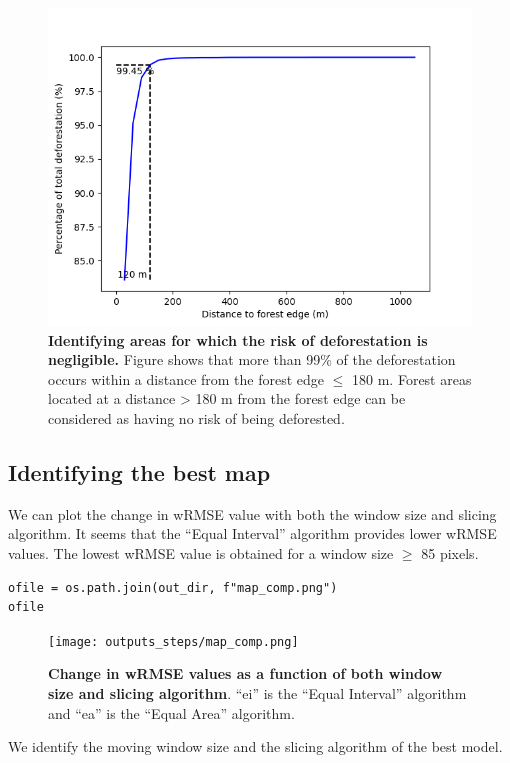 \documentclass[paper=a4, 12pt, DIV=12]{scrartcl}
\begin{document}
\begin{figure}[H]
\centering
\includegraphics[width=0.8\linewidth]{outputs_steps/perc_dist.png}
\caption{\label{fig:orgebfc8c3}\textbf{Identifying areas for which the risk of deforestation is negligible.} Figure shows that more than 99\% of the deforestation occurs within a distance from the forest edge \(\leq\) 180 m. Forest areas located at a distance > 180 m from the forest edge can be considered as having no risk of being deforested.}
\end{figure}

\subsection{Identifying the best map}
\label{sec:org5a11817}

We can plot the change in wRMSE value with both the window size and slicing algorithm. It seems that the ``Equal Interval'' algorithm provides lower wRMSE values. The lowest wRMSE value is obtained for a window size \(\geq\) 85 pixels. 

\begin{verbatim}
ofile = os.path.join(out_dir, f"map_comp.png")
ofile
\end{verbatim}

\begin{figure}[H]
\centering
\texttt{[image: outputs\_steps/map\_comp.png]}
\caption{\label{fig:orgdbba99e}\textbf{Change in wRMSE values as a function of both window size and slicing algorithm}. ``ei'' is the ``Equal Interval'' algorithm and ``ea'' is the ``Equal Area'' algorithm.}
\end{figure}

We identify the moving window size and the slicing algorithm of the best model.
\end{document}
